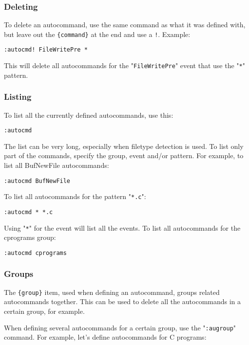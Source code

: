\subsubsection{Deleting}
To delete an autocommand, use the same command as what it was defined with, but leave out the \texttt{\{command\}} at the end and use a \texttt{!}.
Example:

\begin{Verbatim}[samepage=true]
 :autocmd! FileWritePre *
\end{Verbatim}

This will delete all autocommands for the "\texttt{FileWritePre}" event that use the "\texttt{*}" pattern.
\subsubsection{Listing}
To list all the currently defined autocommands, use this:

\begin{Verbatim}[samepage=true]
 :autocmd
\end{Verbatim}

The list can be very long, especially when filetype detection is used.
To list only part of the commands, specify the group, event and/or pattern.
For example, to list all BufNewFile autocommands:

\begin{Verbatim}[samepage=true]
 :autocmd BufNewFile
\end{Verbatim}

To list all autocommands for the pattern "\texttt{*.c}":

\begin{Verbatim}[samepage=true]
 :autocmd * *.c
\end{Verbatim}

Using "\texttt{*}" for the event will list all the events.
To list all autocommands for the cprograms group:

\begin{Verbatim}[samepage=true]
 :autocmd cprograms
\end{Verbatim}

\subsubsection{Groups}
The \texttt{\{group\}} item, used when defining an autocommand, groups related autocommands together.
This can be used to delete all the autocommands in a certain group, for example.

When defining several autocommands for a certain group, use the "\texttt{:augroup}" command.
For example, let's define autocommands for C programs:

